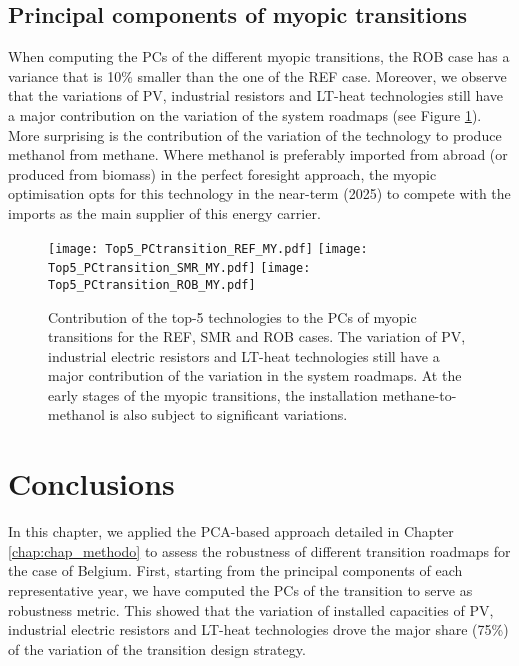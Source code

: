 \subsection{Principal components of myopic transitions}
\label{subsec:RobPol:PC_MY_transition}
When computing the \gls{PCs} of the different myopic transitions, the ROB case has a variance that is 10\% smaller than the one of the REF case. Moreover, we observe that the variations of \gls{PV}, industrial resistors and \gls{LT}-heat technologies still have a major contribution on the variation of the system roadmaps (see Figure \ref{fig:Top5_PCtransition_cases}). More surprising is the contribution of the variation of the technology to produce methanol from methane. Where methanol is preferably imported from abroad (or produced from biomass) in the perfect foresight approach, the myopic optimisation opts for this technology in the near-term (2025) to compete with the imports as the main supplier of this energy carrier.

\begin{figure}[!htbp]
\centering
\texttt{[image: Top5\_PCtransition\_REF\_MY.pdf]}
\texttt{[image: Top5\_PCtransition\_SMR\_MY.pdf]}
\texttt{[image: Top5\_PCtransition\_ROB\_MY.pdf]}
\caption{Contribution of the top-5 technologies to the \gls{PCs} of myopic transitions for the REF, SMR and ROB cases. The variation of \gls{PV}, industrial electric resistors and \gls{LT}-heat technologies still have a major contribution of the variation in the system roadmaps. At the early stages of the myopic transitions, the installation methane-to-methanol is also subject to significant variations.}
\label{fig:Top5_PCtransition_cases}
\end{figure}

\newpage
\section{Conclusions}
\label{sec:RobPol:Conclusions}
In this chapter, we applied the \gls{PCA}-based approach detailed in Chapter \ref{chap:chap_methodo} to assess the robustness of different transition roadmaps for the case of Belgium. First, starting from the principal components of each representative year, we have computed the PCs of the transition to serve as robustness metric. This showed that the variation of installed capacities of \gls{PV}, industrial electric resistors and \gls{LT}-heat technologies drove the major share (75\%) of the variation of the transition design strategy.  

